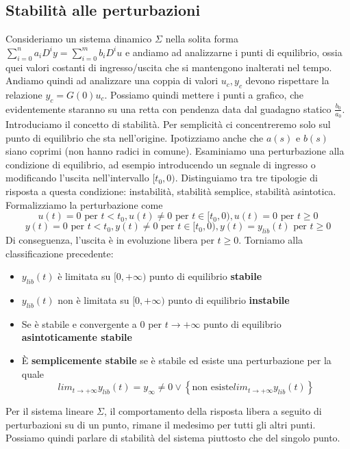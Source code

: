 \documentclass[11pt]{article}
\begin{document}
\subsection{Stabilità alle perturbazioni}
Consideriamo un sistema dinamico $\Sigma$ nella solita forma $\sum_{i=0}^n a_i D^i y = \sum_{i=0}^m b_i D^i u$ e andiamo ad analizzarne i punti di equilibrio, ossia quei valori costanti di ingresso/uscita che si mantengono inalterati nel tempo. Andiamo quindi ad analizzare una coppia di valori $u_c, y_c$ devono rispettare la relazione $y_c = G(0)u_c$. Possiamo quindi mettere i punti a grafico, che evidentemente staranno su una retta con pendenza data dal guadagno statico $\frac{b_0}{a_0}$.
Introduciamo il concetto di stabilità. Per semplicità ci concentreremo solo sul punto di equilibrio che sta nell'origine. Ipotizziamo anche che $a(s)$ e $b(s)$ siano coprimi (non hanno radici in comune). Esaminiamo una perturbazione alla condizione di equilibrio, ad esempio introducendo un segnale di ingresso o modificando l'uscita nell'intervallo $[t_0,0)$.
Distinguiamo tra tre tipologie di risposta a questa condizione: instabilità, stabilità semplice, stabilità asintotica. Formalizziamo la perturbazione come
\begin{displaymath}
    u(t) = 0 \textrm{ per }t<t_0, u(t) \neq 0 \textrm{ per }t\in[t_0, 0), u(t)=0 \textrm{ per }t\ge0
\end{displaymath}
\begin{displaymath}
    y(t) = 0 \textrm{ per }t<t_0, y(t) \neq 0 \textrm{ per }t\in [t_0,0), y(t)=y_{lib}(t) \textrm{ per }t\ge0
\end{displaymath}
Di conseguenza, l'uscita è in evoluzione libera per $t\ge0$.
Torniamo alla classificazione precedente:
\begin{itemize}
    \item $y_{lib}(t)$ è limitata su $[0,+\infty)$ punto di equilibrio \textbf{stabile}
    \item $y_{lib}(t)$ non è limitata su $[0,+\infty)$ punto di equilibrio \textbf{instabile}
    \item Se è stabile e convergente a $0$ per $t\rightarrow+\infty$ punto di equilibrio \textbf{asintoticamente stabile}
    \item È \textbf{semplicemente stabile} se è stabile ed esiste una perturbazione per la quale \begin{displaymath}
              lim_{t\rightarrow+\infty}y_{lib}(t)=y_\infty \neq 0 \vee \left\{\textrm{non esiste} lim_{t\rightarrow+\infty} y_{lib}(t)\right\}
          \end{displaymath}
\end{itemize}
\begin{center}
    Per il sistema lineare $\Sigma$, il comportamento della risposta libera a seguito di perturbazioni su di un punto, rimane il medesimo per tutti gli altri punti. Possiamo quindi parlare di stabilità del sistema piuttosto che del singolo punto.
\end{center}
\end{document}
